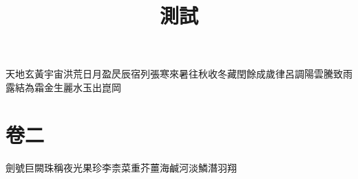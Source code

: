 \documentclass{ltc-guji}
\title{測試}
\begin{document}
\begin{正文}
天地玄黃宇宙洪荒日月盈昃辰宿列張寒來暑往秋收冬藏閏餘成歲律呂調陽雲騰致雨露結為霜金生麗水玉出崑岡
\end{正文}
\chapter{卷二}
\begin{正文}
劍號巨闕珠稱夜光果珍李柰菜重芥薑海鹹河淡鱗潛羽翔
\end{正文}
\end{document}
